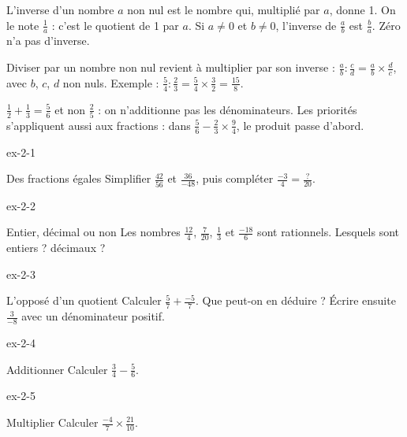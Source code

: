 \begin{definition}L’inverse d’un nombre $a$ non nul est le nombre qui, multiplié par $a$, donne 1. On le note $\frac1a$ : c’est le quotient de 1 par $a$. Si $a\ne0$ et $b\ne0$, l’inverse de $\frac ab$ est $\frac ba$. Zéro n’a pas d’inverse.\end{definition}
\begin{propriete}Diviser par un nombre non nul revient à multiplier par son inverse : $\frac ab:\frac cd=\frac ab\times\frac dc$, avec $b$, $c$, $d$ non nuls. Exemple : $\frac54:\frac23=\frac54\times\frac32=\frac{15}8$.\end{propriete}
\begin{attention}$\frac12+\frac13=\frac56$ et non $\frac25$ : on n’additionne pas les dénominateurs. Les priorités s’appliquent aussi aux fractions : dans $\frac56-\frac23\times\frac94$, le produit passe d’abord.\end{attention}

\clearpage{}
\begin{blocLivre}{ex-2-1}\begin{exercice}[1]{Des fractions égales}
Simplifier $\frac{42}{56}$ et $\frac{36}{-48}$, puis compléter $\frac{-3}{4}=\frac{\,?\,}{20}$.
\end{exercice}\end{blocLivre}
\begin{blocLivre}{ex-2-2}\begin{exercice}[1]{Entier, décimal ou non}
Les nombres $\frac{12}4$, $\frac7{20}$, $\frac13$ et $\frac{-18}6$ sont rationnels. Lesquels sont entiers ? décimaux ?
\end{exercice}\end{blocLivre}
\begin{blocLivre}{ex-2-3}\begin{exercice}[1]{L’opposé d’un quotient}
Calculer $\frac57+\frac{-5}7$. Que peut-on en déduire ? Écrire ensuite $\frac3{-8}$ avec un dénominateur positif.
\end{exercice}\end{blocLivre}
\begin{blocLivre}{ex-2-4}\begin{exercice}[1]{Additionner}
Calculer $\frac34-\frac56$.
\end{exercice}\end{blocLivre}
\begin{blocLivre}{ex-2-5}\begin{exercice}[1]{Multiplier}
Calculer $\frac{-4}{7}\times\frac{21}{10}$.
\end{exercice}\end{blocLivre}


